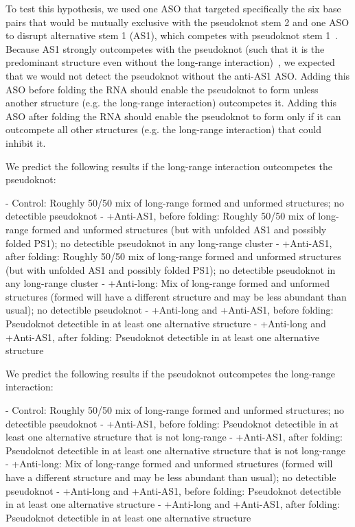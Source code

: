 \documentclass[main.tex]{subfiles}
\begin{document}
To test this hypothesis, we used one ASO that targeted specifically the six base pairs that would be mutually exclusive with the pseudoknot stem 2 and one ASO to disrupt alternative stem 1 (AS1), which competes with pseudoknot stem 1~\cite{Lan2022}.
Because AS1 strongly outcompetes with the pseudoknot (such that it is the predominant structure even without the long-range interaction)~\cite{Lan2022}, we expected that we would not detect the pseudoknot without the anti-AS1 ASO.
Adding this ASO before folding the RNA should enable the pseudoknot to form unless another structure (e.g. the long-range interaction) outcompetes it.
Adding this ASO after folding the RNA should enable the pseudoknot to form only if it can outcompete all other structures (e.g. the long-range interaction) that could inhibit it.

We predict the following results if the long-range interaction outcompetes the pseudoknot:

- Control: Roughly 50/50 mix of long-range formed and unformed structures; no detectible pseudoknot
- +Anti-AS1, before folding: Roughly 50/50 mix of long-range formed and unformed structures (but with unfolded AS1 and possibly folded PS1); no detectible pseudoknot in any long-range cluster
- +Anti-AS1, after folding: Roughly 50/50 mix of long-range formed and unformed structures (but with unfolded AS1 and possibly folded PS1); no detectible pseudoknot in any long-range cluster
- +Anti-long: Mix of long-range formed and unformed structures (formed will have a different structure and may be less abundant than usual); no detectible pseudoknot
- +Anti-long and +Anti-AS1, before folding: Pseudoknot detectible in at least one alternative structure
- +Anti-long and +Anti-AS1, after folding: Pseudoknot detectible in at least one alternative structure

We predict the following results if the pseudoknot outcompetes the long-range interaction:

- Control: Roughly 50/50 mix of long-range formed and unformed structures; no detectible pseudoknot
- +Anti-AS1, before folding: Pseudoknot detectible in at least one alternative structure that is not long-range
- +Anti-AS1, after folding: Pseudoknot detectible in at least one alternative structure that is not long-range
- +Anti-long: Mix of long-range formed and unformed structures (formed will have a different structure and may be less abundant than usual); no detectible pseudoknot
- +Anti-long and +Anti-AS1, before folding: Pseudoknot detectible in at least one alternative structure
- +Anti-long and +Anti-AS1, after folding: Pseudoknot detectible in at least one alternative structure
\end{document}
